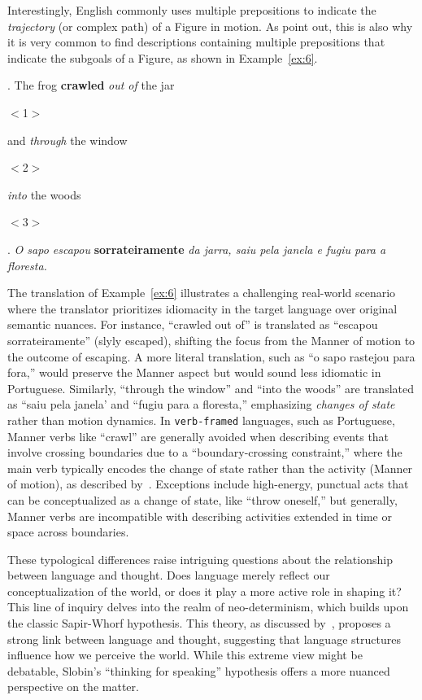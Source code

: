 {{Interestingly, English commonly uses multiple prepositions to indicate the \emph{trajectory} (or complex path) of a Figure in motion. As \textcite{oliveira2022expressing} point out, this is also why it is very common to find descriptions containing multiple prepositions that indicate the subgoals of a Figure, as shown in Example~\ref{ex:6}.

\ex. 
    The frog \textbf{crawled} \textit{out of} the jar\begin{scriptsize}$<$1$>$\end{scriptsize} and \textit{through} the window\begin{scriptsize}$<$2$>$\end{scriptsize} \textit{into} the woods\begin{scriptsize}$<$3$>$\end{scriptsize}. \label{ex:6} 
    \emph{O sapo escapou} \textbf{sorrateiramente} \emph{da jarra, saiu pela janela e fugiu para a floresta.}


The translation of Example~\ref{ex:6}  illustrates a challenging real-world scenario where the translator prioritizes idiomacity in the target language over original semantic nuances. For instance, ``crawled out of'' is translated as ``escapou sorrateiramente'' (slyly escaped), shifting the focus from the Manner of motion to the outcome of escaping. A more literal translation, such as ``o sapo rastejou para fora,'' would preserve the Manner aspect but would sound less idiomatic in Portuguese. Similarly, ``through the window'' and ``into the woods'' are translated as ``saiu pela janela' and ``fugiu para a floresta,'' emphasizing \emph{changes of state} rather than motion dynamics. In \texttt{verb-framed} languages, such as Portuguese, Manner verbs like ``crawl'' are generally avoided when describing events that involve crossing boundaries due to a ``boundary-crossing constraint,'' where the main verb typically encodes the change of state rather than the activity (Manner of motion), as described by~\textcite{Slobin2006WhatMM}. Exceptions include high-energy, punctual acts that can be conceptualized as a change of state, like ``throw oneself,'' but generally, Manner verbs are incompatible with describing activities extended in time or space across boundaries.

These typological differences raise intriguing questions about the relationship between language and thought. Does language merely reflect our conceptualization of the world, or does it play a more active role in shaping it? This line of inquiry delves into the realm of neo-determinism, which builds upon the classic Sapir-Whorf hypothesis. This theory, as discussed by~\textcite{cadierno2017thinking}, proposes a strong link between language and thought, suggesting that language structures influence how we perceive the world. While this extreme view might be debatable, Slobin's ``thinking for speaking'' hypothesis \parencite{slobin1996thought, Slobin-2004, slobin2005relating} offers a more nuanced perspective on the matter.

}}
